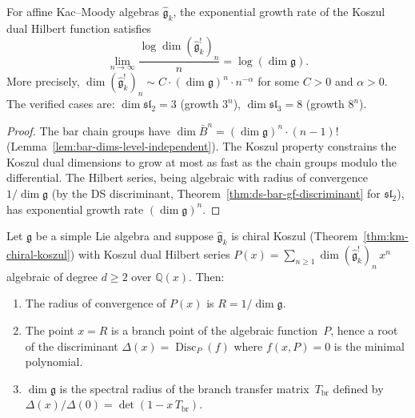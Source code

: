\begin{corollary}
\label{cor:growth-rate-dimg}
For affine Kac--Moody algebras $\widehat{\mathfrak{g}}_k$, the exponential growth rate of the Koszul dual Hilbert function satisfies
\[
\lim_{n \to \infty} \frac{\log \dim (\widehat{\mathfrak{g}}_k^!)_n}{n} = \log(\dim \mathfrak{g}).
\]
More precisely, $\dim (\widehat{\mathfrak{g}}_k^!)_n \sim C \cdot (\dim \mathfrak{g})^n \cdot n^{-\alpha}$ for some $C > 0$ and $\alpha > 0$.  The verified cases are: $\dim \mathfrak{sl}_2 = 3$ (growth $3^n$), $\dim \mathfrak{sl}_3 = 8$ (growth $8^n$).
\end{corollary}

\begin{proof}
The bar chain groups have $\dim \bar{B}^n = (\dim \mathfrak{g})^n \cdot (n{-}1)!$ (Lemma~\ref{lem:bar-dims-level-independent}).  The Koszul property constrains the Koszul dual dimensions to grow at most as fast as the chain groups modulo the differential.  The Hilbert series, being algebraic with radius of convergence $1/\dim\mathfrak{g}$ (by the DS discriminant, Theorem~\ref{thm:ds-bar-gf-discriminant} for $\mathfrak{sl}_2$), has exponential growth rate $(\dim \mathfrak{g})^n$.
\end{proof}

\begin{theorem}
\label{thm:dominant-branch-point}
Let $\mathfrak{g}$ be a simple Lie algebra and suppose
$\widehat{\mathfrak{g}}_k$ is chiral Koszul
\textup{(}Theorem~\textup{\ref{thm:km-chiral-koszul})} with
Koszul dual Hilbert series
$P(x) = \sum_{n \geq 1} \dim(\widehat{\mathfrak{g}}_k^!)_n\, x^n$
algebraic of degree $d \geq 2$ over $\mathbb{Q}(x)$.  Then:
\begin{enumerate}[label=\textup{(\roman*)}]
\item The radius of convergence of $P(x)$ is
  $R = 1/\dim\mathfrak{g}$.
\item The point $x = R$ is a branch point of the algebraic
  function~$P$, hence a root of the discriminant
  $\Delta(x) = \operatorname{Disc}_P(f)$ where
  $f(x,P) = 0$ is the minimal polynomial.
\item $\dim\mathfrak{g}$ is the spectral radius of the branch
  transfer matrix~$T_{\mathrm{br}}$ defined by
  $\Delta(x)/\Delta(0) = \det(1 - x\,T_{\mathrm{br}})$.
\end{enumerate}
\end{theorem}


